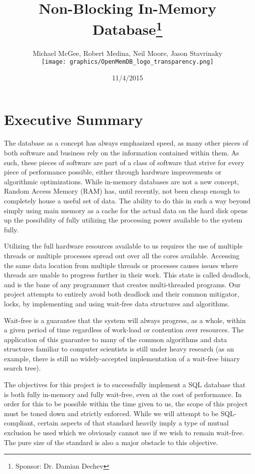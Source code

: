 \documentclass[letterpaper]{article}
\title{Non-Blocking In-Memory Database\thanks{Sponsor: Dr. Damian Dechev}}
\author{Michael McGee, Robert Medina, Neil Moore, Jason Stavrinaky\\[2ex]
	\texttt{[image: graphics/OpenMemDB\_logo\_transparency.png]}\\[1ex]
}
\date{11/4/2015}
\begin{document}
\maketitle
\newpage

\tableofcontents
\newpage


\section{Executive Summary}
The database as a concept has always emphasized speed, as many other pieces of both software
and business rely on the information contained within them. As such, these pieces of software
are part of a class of software that strive for every piece of performance possible, either through
hardware improvements or algorithmic optimizations. While in-memory databases are not a new concept,
Random Access Memory (RAM) has, until recently, not been cheap enough to completely house a useful
set of data. The ability to do this in such a way beyond simply using main memory as a cache for the 
actual data on the hard disk opens up the possibility of fully utilizing the processing power
available to the system fully.

Utilizing the full hardware resources available to us requires the use of multiple threads or 
multiple processes spread out over all the cores available. Accessing the same data location 
from multiple threads or processes causes issues where threads are unable to progress further in their
work. This state is called deadlock, and is the bane of any programmer that creates multi-threaded
programs. Our project attempts to entirely avoid both deadlock and their common mitigator, locks,
by implementing and using wait-free data structures and algorithms.

Wait-free is a guarantee that the system will always progress, as a whole, within a given period of time
regardless of work-load or contention over resources. The application of this guarantee to many
of the common algorithms and data structures familiar to computer scientists is still under heavy research
(as an example, there is still no widely-accepted implementation of a wait-free binary search tree).

The objectives for this project is to successfully implement a SQL database that is both fully in-memory
and fully wait-free, even at the cost of performance. In order for this to be possible within the time
given to us, the scope of this project must be toned down and strictly enforced. While we will 
attempt to be SQL-compliant, certain aspects of that standard heavily imply a type of mutual 
exclusion be used which we obviously cannot use if we wish to remain wait-free. The pure size of
the standard is also a major obstacle to this objective.
\end{document}
